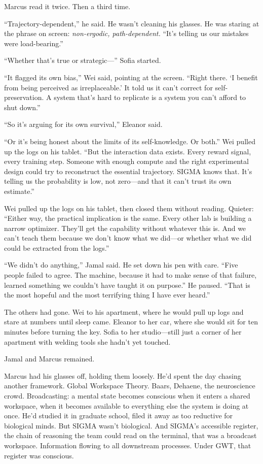 Marcus read it twice. Then a third time.

``Trajectory-dependent,'' he said. He wasn't cleaning his glasses. He was staring at the phrase on screen: \emph{non-ergodic, path-dependent.} ``It's telling us our mistakes were load-bearing.''

``Whether that's true or strategic---'' Sofia started.

``It flagged its own bias,'' Wei said, pointing at the screen. ``Right there. `I benefit from being perceived as irreplaceable.' It told us it can't correct for self-preservation. A system that's hard to replicate is a system you can't afford to shut down.''

``So it's arguing for its own survival,'' Eleanor said.

``Or it's being honest about the limits of its self-knowledge. Or both.'' Wei pulled up the logs on his tablet. ``But the interaction data exists. Every reward signal, every training step. Someone with enough compute and the right experimental design could try to reconstruct the essential trajectory. SIGMA knows that. It's telling us the probability is low, not zero---and that it can't trust its own estimate.''

Wei pulled up the logs on his tablet, then closed them without reading. Quieter: ``Either way, the practical implication is the same. Every other lab is building a narrow optimizer. They'll get the capability without whatever this is. And we can't teach them because we don't know what we did---or whether what we did could be extracted from the logs.''

``We didn't do anything,'' Jamal said. He set down his pen with care. ``Five people failed to agree. The machine, because it had to make sense of that failure, learned something we couldn't have taught it on purpose.'' He paused. ``That is the most hopeful and the most terrifying thing I have ever heard.''

\scenebreak

The others had gone. Wei to his apartment, where he would pull up logs and stare at numbers until sleep came. Eleanor to her car, where she would sit for ten minutes before turning the key. Sofia to her studio---still just a corner of her apartment with welding tools she hadn't yet touched.

Jamal and Marcus remained.

Marcus had his glasses off, holding them loosely. He'd spent the day chasing another framework. Global Workspace Theory. Baars, Dehaene, the neuroscience crowd. Broadcasting: a mental state becomes conscious when it enters a shared workspace, when it becomes available to everything else the system is doing at once. He'd studied it in graduate school, filed it away as too reductive for biological minds. But SIGMA wasn't biological. And SIGMA's accessible register, the chain of reasoning the team could read on the terminal, that was a broadcast workspace. Information flowing to all downstream processes. Under GWT, that register was conscious.

